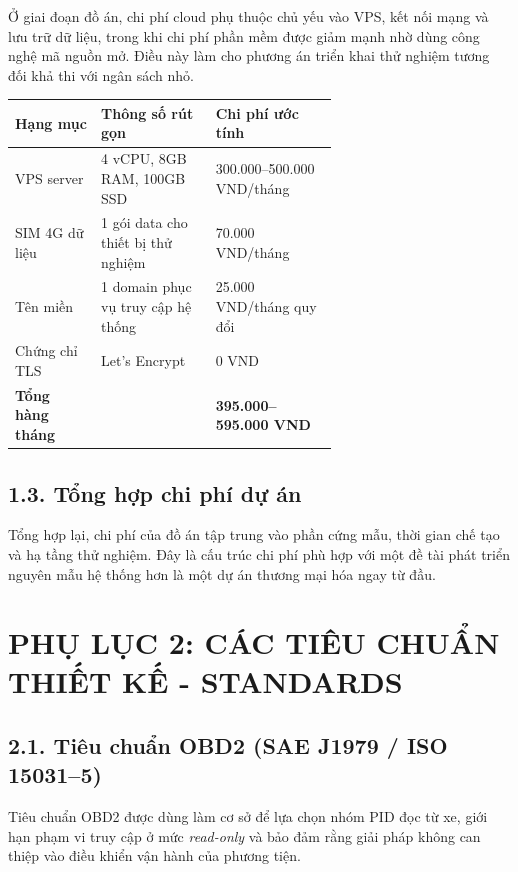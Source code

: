 \documentclass[a4paper]{extarticle}
\newcommand{\appendixsection}[1]{\clearpage\section{#1}}
\begin{document}
Ở giai đoạn đồ án, chi phí cloud phụ thuộc chủ yếu vào VPS, kết nối mạng và lưu trữ dữ liệu, trong khi chi phí phần mềm được giảm mạnh nhờ dùng công nghệ mã nguồn mở. Điều này làm cho phương án triển khai thử nghiệm tương đối khả thi với ngân sách nhỏ.

\begin{center}
\begin{tabular}{|p{0.18\linewidth}|p{0.24\linewidth}|p{0.22\linewidth}|}
\hline
\textbf{Hạng mục} & \textbf{Thông số rút gọn} & \textbf{Chi phí ước tính} \\
\hline
VPS server & 4 vCPU, 8GB RAM, 100GB SSD & 300.000--500.000 VND/tháng \\
\hline
SIM 4G dữ liệu & 1 gói data cho thiết bị thử nghiệm & 70.000 VND/tháng \\
\hline
Tên miền & 1 domain phục vụ truy cập hệ thống & 25.000 VND/tháng quy đổi \\
\hline
Chứng chỉ TLS & Let's Encrypt & 0 VND \\
\hline
\textbf{Tổng hàng tháng} & & \textbf{395.000--595.000 VND} \\
\hline
\end{tabular}
\end{center}

\subsection{1.3. Tổng hợp chi phí dự
án}\label{13-tux1ed5ng-hux1ee3p-chi-phuxed-dux1ef1-uxe1n}

Tổng hợp lại, chi phí của đồ án tập trung vào phần cứng mẫu, thời gian chế tạo và hạ tầng thử nghiệm. Đây là cấu trúc chi phí phù hợp với một đề tài phát triển nguyên mẫu hệ thống hơn là một dự án thương mại hóa ngay từ đầu.

\appendixsection{PHỤ LỤC 2: CÁC TIÊU CHUẨN THIẾT KẾ -
STANDARDS}\label{phux1ee5-lux1ee5c-2-cuxe1c-tiuxeau-chuux1ea9n-thiux1ebft-kux1ebf---standards}

\subsection{2.1. Tiêu chuẩn OBD2 (SAE J1979 / ISO
15031--5)}\label{21-tiuxeau-chuux1ea9n-obd2-sae-j1979-iso-15031--5}

Tiêu chuẩn OBD2 được dùng làm cơ sở để lựa chọn nhóm PID đọc từ xe, giới hạn phạm vi truy cập ở mức \emph{read-only} và bảo đảm rằng giải pháp không can thiệp vào điều khiển vận hành của phương tiện.
\end{document}
